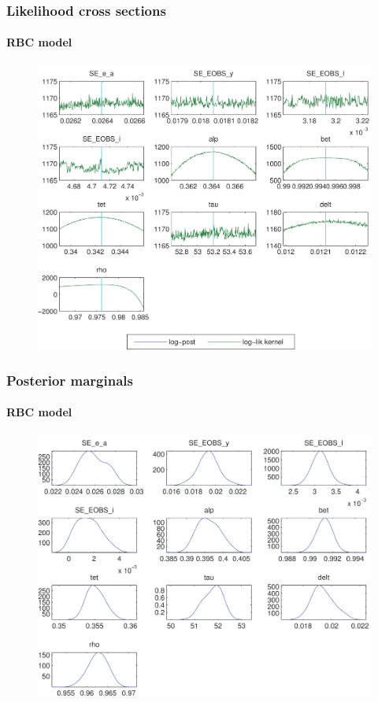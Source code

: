 \documentclass[10pt]{beamer}
\begin{document}
\begin{frame}
\frametitle{Likelihood cross sections}
\framesubtitle{RBC model}

\begin{figure}[H]
   \includegraphics[scale=.6]{../img/SIR_likelihood_cross_sections.pdf}
 \end{figure}
 
\end{frame}


\begin{frame}
  \frametitle{Posterior marginals}
\framesubtitle{RBC model}

\begin{figure}[H]
   \includegraphics[scale=.5]{../img/SIR_posterior_marginals.pdf}
 \end{figure}
 
\end{frame}
\end{document}
